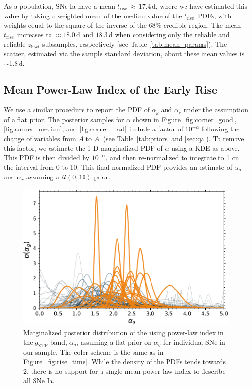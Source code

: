 \documentclass[twocolumn]{aastex63}
\newcommand{\gztf}{$g_\mathrm{ZTF}$}
\newcommand{\trise}{$t_\mathrm{rise}$}
\begin{document}
As a population, SNe Ia have a mean \trise\,$\approx\,17.4$\,d, where we have
estimated this value by taking a weighted mean of the median value of the
\trise\ PDFs, with weights equal to the square of the inverse of the 68\%
credible region. The mean \trise\ increases to $\approx 18.0$\,d and $18.3$\,d
when considering only the reliable and reliable-$z_\mathrm{host}$ subsamples,
respectively (see Table~\ref{tab:mean_params}). The scatter, estimated via the
sample standard deviation, about these mean values is $\sim$1.8\,d.



\subsection{Mean Power-Law Index of the Early Rise}

We use a similar procedure to report the PDF of $\alpha_g$ and $\alpha_r$
under the assumption of a flat prior. The posterior samples for $\alpha$ shown
in Figure~\ref{fig:corner_good}, \ref{fig:corner_median}, and
\ref{fig:corner_bad} include a factor of $10^{-\alpha}$ following the
change of variables from $A$ to $A^\prime$ (see Table~\ref{tab:priors} and
\ref{sec:qa}). To remove this factor, we estimate the 1-D marginalized PDF of
$\alpha$ using a KDE as above. This PDF is then divided by $10^{-\alpha}$, and
then re-normalized to integrate to 1 on the interval from 0 to 10. This final
normalized PDF provides an estimate of $\alpha_g$ and $\alpha_r$ assuming a
$\mathcal{U}(0,10)$ prior.

\begin{figure}
    \centering
    \includegraphics[width=1\linewidth]{./figures/alpha_g.pdf}
    \caption{Marginalized posterior distribution of the rising power-law index
    in the \gztf-band, $\alpha_g$, assuming a flat prior on $\alpha_g$ for
    individual SNe in our sample. The color scheme is the same as in
    Figure~\ref{fig:rise_time}. While the density of the PDFs tends towards 2,
    there is no support for a single mean power-law index to describe all SNe
    Ia.}
    \label{fig:alpha_rise}
\end{figure}
\end{document}
